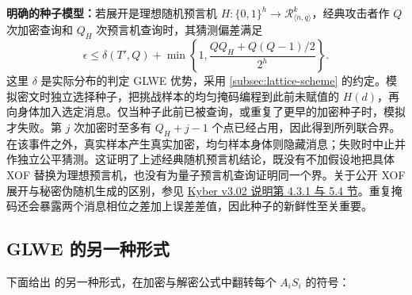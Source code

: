 \noindent\textbf{明确的种子模型：}若展开是理想随机预言机 $H:\{0,1\}^h\to\mathcal R_{\langle n,q\rangle}^k$，经典攻击者作 $Q$ 次加密查询和 $Q_H$ 次预言机查询时，其猜测偏差满足
\[
\epsilon\le\delta(T',Q)+\min\left\{1,\frac{QQ_H+Q(Q-1)/2}{2^h}\right\}.
\]
这里 $\delta$ 是实际分布的判定 GLWE 优势，采用 \autoref{subsec:lattice-scheme} 的约定。模拟密文时独立选择种子，把挑战样本的均匀掩码编程到此前未赋值的 $H(d)$，再向身体加入选定消息。仅当种子此前已被查询，或重复了更早的加密种子时，模拟才失败。第 $j$ 次加密时至多有 $Q_H+j-1$ 个点已经占用，因此得到所列联合界。在该事件之外，真实样本产生真实加密，均匀样本身体则隐藏消息；失败时中止并作独立公平猜测。这证明了上述经典随机预言机结论，既没有不加假设地把具体 XOF 替换为理想预言机，也没有为量子预言机查询证明同一个界。关于公开 XOF 展开与秘密伪随机生成的区别，参见 \href{https://pq-crystals.org/kyber/data/kyber-specification-round3-20210804.pdf}{Kyber v3.02 说明第 4.3.1 与 5.4 节}。重复掩码还会暴露两个消息相位之差加上误差差值，因此种子的新鲜性至关重要。

\subsection{GLWE 的另一种形式}
\label{subsec:glwe-alternative}

下面给出 \tboxlabel{\ref*{subsec:glwe-enc}} 的另一种形式，在加密与解密公式中翻转每个 $A_iS_i$ 的符号：

